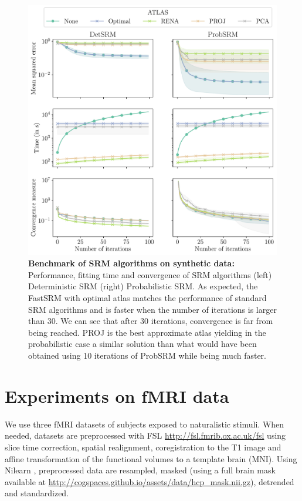 \begin{figure}
  \centering
  \includegraphics[width=\textwidth]{figures/srm/synthetic_gradient.pdf}
  \caption{\textbf{Benchmark of SRM algorithms on synthetic data: } Performance,
    fitting time and convergence of SRM algorithms (left) Deterministic SRM
    (right) Probabilistic SRM.  As expected, the FastSRM with optimal atlas matches the performance of standard SRM algorithms and is faster when the number of
    iterations is larger than 30. We can see that after 30 iterations,
    convergence is far from being reached. PROJ is the best approximate atlas
    yielding in the probabilistic case a similar solution than what would have
    been obtained using 10 iterations of ProbSRM while being much faster.}
  \label{fig:srm:synthetic_gradient}
\end{figure}

\section{Experiments on fMRI data}
\label{srm:datasets:fmri}
We use three fMRI datasets of subjects exposed to naturalistic stimuli. When
needed, datasets are preprocessed with FSL \url{http://fsl.fmrib.ox.ac.uk/fsl}
using slice time correction, spatial realignment, coregistration to the T1 image
and affine transformation of the functional volumes to a template brain (MNI).
Using Nilearn \cite{abraham2014machine}, preprocessed data are resampled, masked
(using a full brain mask available at
\url{http://cogspaces.github.io/assets/data/hcp_mask.nii.gz}), detrended and
standardized.

